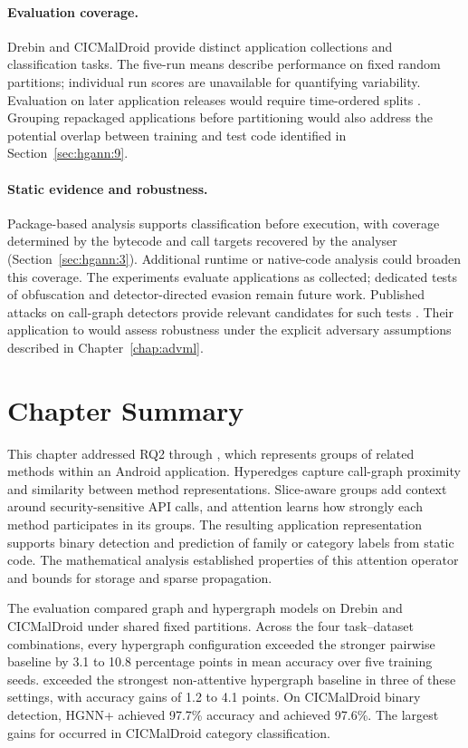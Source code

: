 \paragraph{Evaluation coverage.} Drebin and CICMalDroid provide distinct application collections
and classification tasks. The five-run means describe performance on fixed random partitions;
individual run scores are unavailable for quantifying variability. Evaluation on later
application releases would require time-ordered splits \cite{pendlebury2019tesseract}.
Grouping repackaged applications before partitioning would also address the potential overlap
between training and test code identified in Section~\ref{sec:hgann:9}.

\paragraph{Static evidence and robustness.} Package-based analysis supports classification before
execution, with coverage determined by the bytecode and call targets recovered by the analyser
(Section~\ref{sec:hgann:3}). Additional runtime or native-code analysis could broaden this
coverage. The experiments evaluate applications as collected; dedicated tests of obfuscation
and detector-directed evasion remain future work. Published attacks on call-graph detectors
provide relevant candidates for such tests
\cite{zhao2021structural,song2026fcghunter,li2025efficient}. Their application to \hgann{}
would assess robustness under the explicit adversary assumptions described in
Chapter~\ref{chap:advml}.

\section{Chapter Summary}
\label{sec:hgann:15}

This chapter addressed RQ2 through \hgann{}, which represents groups of related methods within
an Android application. Hyperedges capture call-graph proximity and similarity between method
representations. Slice-aware groups add context around security-sensitive API calls, and
attention learns how strongly each method participates in its groups. The resulting application
representation supports binary detection and prediction of family or category labels from
static code. The mathematical analysis established properties of this attention operator and
bounds for storage and sparse propagation.

The evaluation compared graph and hypergraph models on Drebin and CICMalDroid under shared
fixed partitions. Across the four task--dataset combinations, every hypergraph configuration
exceeded the stronger pairwise baseline by 3.1 to 10.8 percentage points in mean accuracy over
five training seeds. \hgann{} exceeded the strongest non-attentive hypergraph baseline in
three of these settings, with accuracy gains of 1.2 to 4.1 points. On CICMalDroid binary
detection, HGNN+ achieved 97.7\% accuracy and \hgann{} achieved 97.6\%. The largest gains for
\hgann{} occurred in CICMalDroid category classification.

